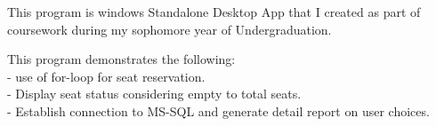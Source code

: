 \documentclass[hidelinks]{deedy-resume-openfont}
\renewcommand{\sectionsep}[0]{\vspace{8pt}}
\begin{document}
\begin{minipage}[t]{0.66\textwidth}
\descript{}
\begin{tightemize}
\item This program is windows Standalone Desktop App that I created as part of
 coursework during my sophomore year of Undergraduation. 
\item This program demonstrates the following:\\
  - use of for-loop for seat reservation.\\
  - Display seat status considering empty to total seats.\\
  - Establish connection to MS-SQL and generate detail report on user choices.
\end{tightemize}
\sectionsep




%
%




\end{minipage}
\end{document}
